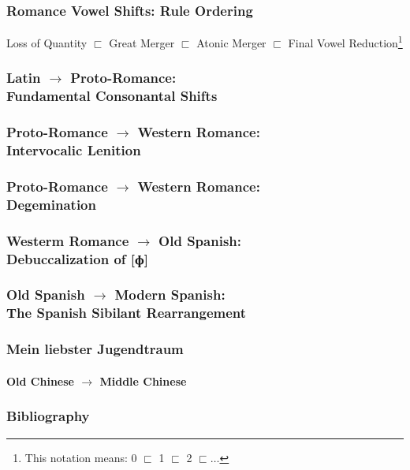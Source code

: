 \documentclass{beamer}
\begin{document}
\begin{frame}
  \frametitle{Romance Vowel Shifts: Rule Ordering}
  
  Loss of Quantity $\sqsubset$ Great Merger $\sqsubset$ Atonic Merger $\sqsubset$ Final Vowel Reduction\footnote{This notation means: 0 $\sqsubset$ 1 $\sqsubset$ 2 $\sqsubset \dots$}
\end{frame}

\begin{frame}
  \frametitle{Latin $\rightarrow$ Proto-Romance: \\ Fundamental Consonantal Shifts}
\end{frame}

\begin{frame}
  \frametitle{Proto-Romance $\rightarrow$ Western Romance: \\ Intervocalic Lenition}
\end{frame}

\begin{frame}
  \frametitle{Proto-Romance $\rightarrow$ Western Romance: \\ Degemination}
\end{frame}

\begin{frame}
  \frametitle{Westerm Romance $\rightarrow$ Old Spanish: \\ Debuccalization of [ɸ]}
\end{frame}

\begin{frame}
  \frametitle{Old Spanish $\rightarrow$ Modern Spanish: \\ The Spanish Sibilant Rearrangement}
\end{frame}

\begin{frame}
  \frametitle{Mein liebster Jugendtraum}
  \framesubtitle{Old Chinese $\rightarrow$ Middle Chinese}
\end{frame}

\begin{frame}
  \frametitle{Bibliography}

  \printbibliography
\end{frame}
\end{document}
